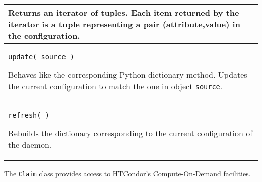 \begin{flushleft}
\begin{tabular}{|p{16cm}|}
Returns an iterator of tuples. 
Each item returned by the iterator is a tuple representing a pair 
(attribute,value) in the configuration.
\\ \hline
\texttt{update( source )}

Behaves like the corresponding Python dictionary method.
Updates the current configuration to match the one in object 
\texttt{source}.
\\ \hline
\texttt{refresh( )}

Rebuilds the dictionary corresponding to the current
configuration of the daemon.
\\ \hline

\end{tabular}
\end{flushleft}

The \texttt{Claim} class provides access to HTCondor's
Compute-On-Demand facilities.

